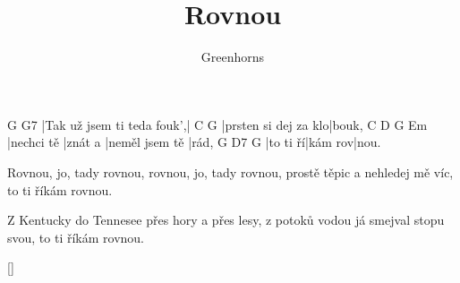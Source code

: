 \documentclass{song}
\title{Rovnou}
\author{Greenhorns}
\begin{document}
\strophe
G                          G7
|Tak už jsem ti teda fouk',|
C                    G
|prsten si dej za klo|bouk,
C          D       G              Em
|nechci tě |znát a |neměl jsem tě |rád,
G        D7      G
|to ti ří|kám rov|nou.
\endstrophe

Rovnou, jo, tady rovnou,
rovnou, jo, tady rovnou,
prostě těpic a nehledej mě víc,
to ti říkám rovnou.
\endstrophe

\strophe*
Z Kentucky do Tennesee
přes hory a přes lesy,
z potoků vodou já smejval stopu svou,
to ti říkám rovnou.
\endstrophe

\ref{}
\end{document}
